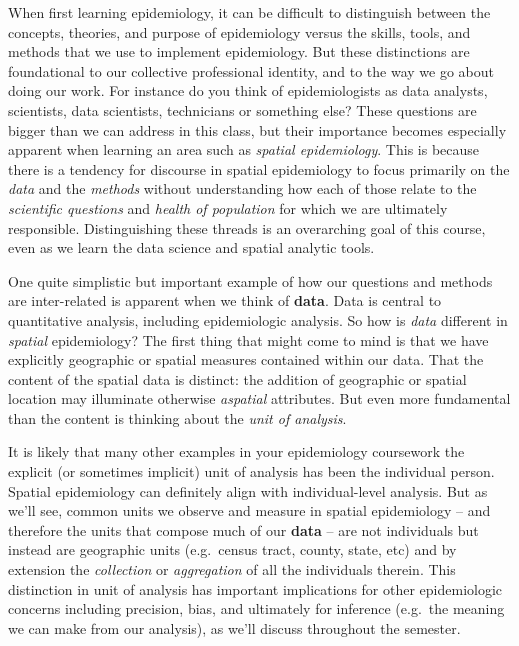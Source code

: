 \documentclass[
]{book}
\begin{document}
When first learning epidemiology, it can be difficult to distinguish between the concepts, theories, and purpose of epidemiology versus the skills, tools, and methods that we use to implement epidemiology. But these distinctions are foundational to our collective professional identity, and to the way we go about doing our work. For instance do you think of epidemiologists as data analysts, scientists, data scientists, technicians or something else? These questions are bigger than we can address in this class, but their importance becomes especially apparent when learning an area such as \emph{spatial epidemiology}. This is because there is a tendency for discourse in spatial epidemiology to focus primarily on the \emph{data} and the \emph{methods} without understanding how each of those relate to the \emph{scientific questions} and \emph{health of population} for which we are ultimately responsible. Distinguishing these threads is an overarching goal of this course, even as we learn the data science and spatial analytic tools.

One quite simplistic but important example of how our questions and methods are inter-related is apparent when we think of \textbf{data}. Data is central to quantitative analysis, including epidemiologic analysis. So how is \emph{data} different in \emph{spatial} epidemiology? The first thing that might come to mind is that we have explicitly geographic or spatial measures contained within our data. That the content of the spatial data is distinct: the addition of geographic or spatial location may illuminate otherwise \emph{aspatial} attributes. But even more fundamental than the content is thinking about the \emph{unit of analysis}.

It is likely that many other examples in your epidemiology coursework the explicit (or sometimes implicit) unit of analysis has been the individual person. Spatial epidemiology can definitely align with individual-level analysis. But as we'll see, common units we observe and measure in spatial epidemiology -- and therefore the units that compose much of our \textbf{data} -- are not individuals but instead are geographic units (e.g.~census tract, county, state, etc) and by extension the \emph{collection} or \emph{aggregation} of all the individuals therein. This distinction in unit of analysis has important implications for other epidemiologic concerns including precision, bias, and ultimately for inference (e.g.~the meaning we can make from our analysis), as we'll discuss throughout the semester.
\end{document}
